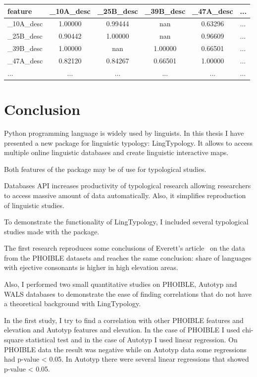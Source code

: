 \documentclass[a4paper,12pt]{article}
\begin{document}
\noindent
\begin{minipage}{\textwidth}
\begin{tabular}{|l|cccc|l|}
\hline
feature & \_10A\_desc & \_25B\_desc & \_39B\_desc & \_47A\_desc & ... \\
\hline
\_10A\_desc &   1.00000 &   0.99444 &       nan &   0.63296 &   ... \\
\_25B\_desc &   0.90442 &   1.00000 &       nan &   0.96609 &   ... \\
\_39B\_desc &   1.00000 &       nan &   1.00000 &   0.66501 &   ... \\
\_47A\_desc &   0.82120 &   0.84267 &   0.66501 &   1.00000 &   ... \\
\hline
... &   ... &   ... &       ... &   ... &   ... \\
\hline
\end{tabular}
\end{minipage}

\newpage

\section{Conclusion}

Python programming language is widely used by linguists. In this thesis I have presented a new package for linguistic typology: LingTypology. It allows to access multiple online linguistic databases and create linguistic interactive maps.

Both features of the package may be of use for typological studies.

Databases API increases productivity of typological research allowing researchers to access massive amount of data automatically. Also, it simplifies reproduction of linguistic studies.

To demonstrate the functionality of LingTypology, I included several typological studies made with the package.

The first research reproduces some conclusions of Everett's article~\parencite{ejectives} on the data from the PHOIBLE datasets and reaches the same conclusion: share of languages with ejective consonants is higher in high elevation areas.

Also, I performed two small quantitative studies on PHOIBLE, Autotyp and WALS databases to demonstrate the ease of finding correlations that do not have a theoretical background with LingTypology.

In the first study, I try to find a correlation with other PHOIBLE features and elevation and Autotyp features and elevation. In the case of PHOIBLE I used chi-square statistical test and in the case of Autotyp I used linear regression. On PHOIBLE data the result was negative while on Autotyp data some regressions had p-value < 0.05. In Autotyp there were several linear regressions that showed p-value < 0.05.
\end{document}
